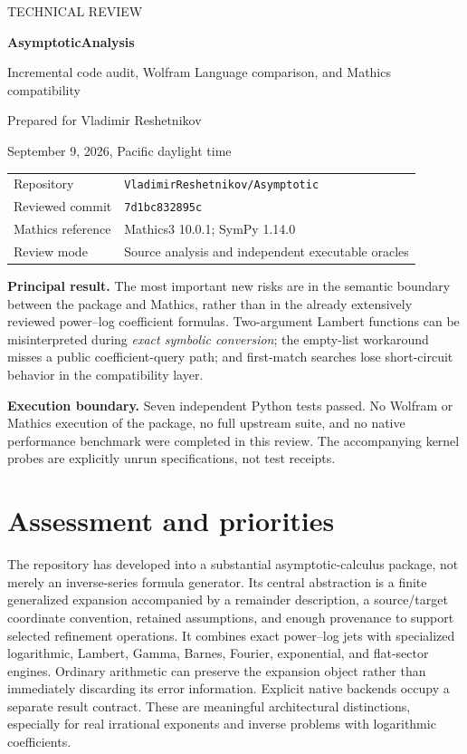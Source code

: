 \documentclass[11pt,letterpaper]{article}
\newcommand{\code}[1]{\texttt{#1}}
\begin{document}
\begin{titlepage}
\vspace*{0.6in}
{\sffamily\large TECHNICAL REVIEW}\par
\vspace{0.35in}
{\sffamily\bfseries\Huge AsymptoticAnalysis}\par
\vspace{0.15in}
{\sffamily\LARGE Incremental code audit, Wolfram Language comparison, and Mathics compatibility}\par
\vspace{0.5in}
{\large Prepared for Vladimir Reshetnikov}\par
September 9, 2026, Pacific daylight time\par
\vspace{0.4in}
\begin{tabular}{@{}ll@{}}
Repository & \code{VladimirReshetnikov/Asymptotic}\\[5pt]
Reviewed commit & \code{7d1bc832895c}\\[5pt]
Mathics reference & Mathics3 10.0.1; SymPy 1.14.0\\[5pt]
Review mode & Source analysis and independent executable oracles
\end{tabular}
\vfill
\textbf{Principal result.} The most important new risks are in the semantic boundary between the package and Mathics, rather than in the already extensively reviewed power--log coefficient formulas. Two-argument Lambert functions can be misinterpreted during \emph{exact symbolic conversion}; the empty-list workaround misses a public coefficient-query path; and first-match searches lose short-circuit behavior in the compatibility layer.

\textbf{Execution boundary.} Seven independent Python tests passed. No Wolfram or Mathics execution of the package, no full upstream suite, and no native performance benchmark were completed in this review. The accompanying kernel probes are explicitly unrun specifications, not test receipts.
\end{titlepage}
\tableofcontents
\newpage

\section{Assessment and priorities}

The repository has developed into a substantial asymptotic-calculus package, not merely an inverse-series formula generator. Its central abstraction is a finite generalized expansion accompanied by a remainder description, a source/target coordinate convention, retained assumptions, and enough provenance to support selected refinement operations. It combines exact power--log jets with specialized logarithmic, Lambert, Gamma, Barnes, Fourier, exponential, and flat-sector engines. Ordinary arithmetic can preserve the expansion object rather than immediately discarding its error information. Explicit native backends occupy a separate result contract. These are meaningful architectural distinctions, especially for real irrational exponents and inverse problems with logarithmic coefficients.~\cite{repo,core,modules,native}
\end{document}

